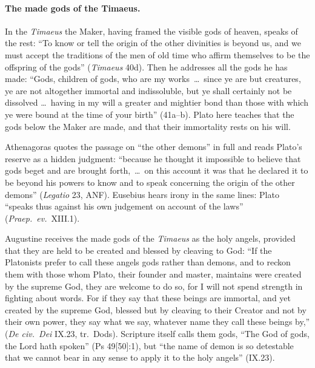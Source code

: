 \paragraph{The made gods of the Timaeus.} In the \emph{Timaeus} the
Maker, having framed the visible gods of heaven, speaks of the rest:
``To know or tell the origin of the other divinities is beyond us, and
we must accept the traditions of the men of old time who affirm
themselves to be the offspring of the gods'' (\emph{Timaeus} 40d). Then
he addresses all the gods he has made: ``Gods, children of gods, who are
my works~\dots\ since ye are but creatures, ye are not altogether
immortal and indissoluble, but ye shall certainly not be dissolved
\dots\ having in my will a greater and mightier bond than those with
which ye were bound at the time of your birth'' (41a--b). Plato here teaches that the gods below
the Maker are made, and that their immortality rests on his will.

Athenagoras quotes the passage on ``the other demons'' in full and reads
Plato's reserve as a hidden judgment: ``because he thought it impossible
to believe that gods beget and are brought forth,~\dots\ on this account
it was that he declared it to be beyond his powers to know and to speak
concerning the origin of the other demons'' (\emph{Legatio} 23, ANF).
Eusebius hears irony in the same lines: Plato ``speaks thus against his
own judgement on account of the laws'' (\emph{Praep.\ ev.}\ XIII.1).

Augustine receives the made gods of the \emph{Timaeus} as the holy
angels, provided that they are held to be created and blessed by
cleaving to God: ``If the Platonists prefer to call these angels gods
rather than demons, and to reckon them with those whom Plato, their
founder and master, maintains were created by the supreme God, they are
welcome to do so, for I will not spend strength in fighting about words.
For if they say that these beings are immortal, and yet created by the
supreme God, blessed but by cleaving to their Creator and not by their
own power, they say what we say, whatever name they call these beings
by,'' 
(\emph{De civ.\ Dei} IX.23, tr.\ Dods). Scripture itself calls them gods, ``The God of gods, the
Lord hath spoken'' (Ps 49[50]:1), but ``the name of demon is so
detestable that we cannot bear in any sense to apply it to the holy
angels'' (IX.23).

